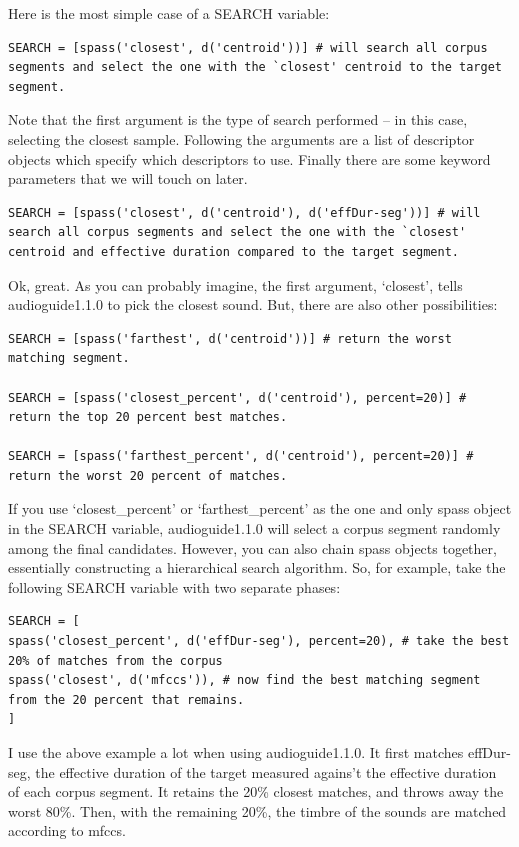 \documentclass{article}
\newcommand{\ag}{audioguide1.1.0\xspace}
\begin{document}
\begin{spacing}{1.2}
Here is the most simple case of a SEARCH variable:
\begin{lstlisting}
SEARCH = [spass('closest', d('centroid'))] # will search all corpus segments and select the one with the `closest' centroid to the target segment.
\end{lstlisting}

Note that the first argument is the type of search performed -- in this case, selecting the closest sample.  Following the arguments are a list of descriptor objects which specify which descriptors to use.  Finally there are some keyword parameters that we will touch on later.

\begin{lstlisting}
SEARCH = [spass('closest', d('centroid'), d('effDur-seg'))] # will search all corpus segments and select the one with the `closest' centroid and effective duration compared to the target segment.
\end{lstlisting}

Ok, great.  As you can probably imagine, the first argument, `closest', tells \ag to pick the closest sound.  But, there are also other possibilities:

\begin{lstlisting}
SEARCH = [spass('farthest', d('centroid'))] # return the worst matching segment.

SEARCH = [spass('closest_percent', d('centroid'), percent=20)] # return the top 20 percent best matches.

SEARCH = [spass('farthest_percent', d('centroid'), percent=20)] # return the worst 20 percent of matches.
\end{lstlisting}

If you use `closest\_percent' or `farthest\_percent' as the one and only spass object in the SEARCH variable, \ag will select a corpus segment randomly among the final candidates.  However, you can also chain spass objects together, essentially constructing a hierarchical search algorithm.  So, for example, take the following SEARCH variable with two separate phases:

\begin{lstlisting}
SEARCH = [
spass('closest_percent', d('effDur-seg'), percent=20), # take the best 20% of matches from the corpus
spass('closest', d('mfccs')), # now find the best matching segment from the 20 percent that remains.
] 
\end{lstlisting}

I use the above example a lot when using \ag.  It first matches effDur-seg, the effective duration of the target measured agains't the effective duration of each corpus segment.  It retains the 20\% closest matches, and throws away the worst 80\%.  Then, with the remaining 20\%, the timbre of the sounds are matched according to mfccs.


\end{spacing}
\end{document}
